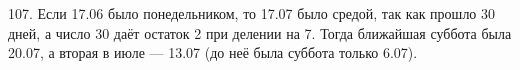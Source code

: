 107. Если 17.06 было понедельником, то 17.07 было средой, так как прошло 30 дней, а число 30 даёт остаток 2 при делении на 7. Тогда ближайшая суббота была 20.07, а вторая в июле --- 13.07 (до неё была суббота только 6.07).\\
